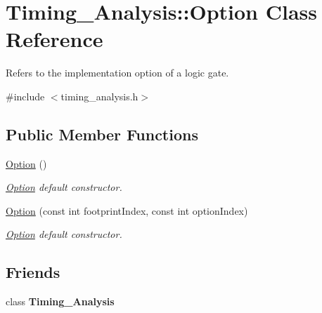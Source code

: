 \hypertarget{classTiming__Analysis_1_1Option}{\section{Timing\-\_\-\-Analysis\-:\-:Option Class Reference}
\label{classTiming__Analysis_1_1Option}
}


Refers to the implementation option of a logic gate.  




{\ttfamily \#include $<$timing\-\_\-analysis.\-h$>$}

\subsection*{Public Member Functions}
\begin{DoxyCompactItemize}
\item 
\hypertarget{classTiming__Analysis_1_1Option_ac426169d74c9d432f168255b6cb52544}{\hyperlink{classTiming__Analysis_1_1Option_ac426169d74c9d432f168255b6cb52544}{Option} ()}\label{classTiming__Analysis_1_1Option_ac426169d74c9d432f168255b6cb52544}

\begin{DoxyCompactList}\small\item\em \hyperlink{classTiming__Analysis_1_1Option}{Option} default constructor. \end{DoxyCompactList}\item 
\hyperlink{classTiming__Analysis_1_1Option_a1d95559d49ea714e293a8679cefe8295}{Option} (const int footprint\-Index, const int option\-Index)
\begin{DoxyCompactList}\small\item\em \hyperlink{classTiming__Analysis_1_1Option}{Option} default constructor. \end{DoxyCompactList}\end{DoxyCompactItemize}
\subsection*{Friends}
\begin{DoxyCompactItemize}
\item 
\hypertarget{classTiming__Analysis_1_1Option_aab560f9cdcd55852a6a08a29a54a2b16}{class {\bfseries Timing\-\_\-\-Analysis}}\label{classTiming__Analysis_1_1Option_aab560f9cdcd55852a6a08a29a54a2b16}

\end{DoxyCompactItemize}


